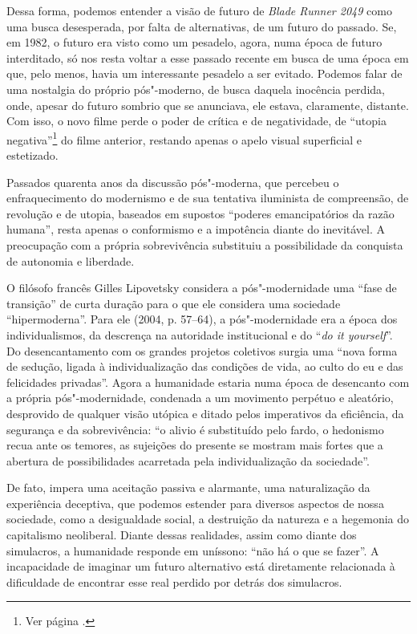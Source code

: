 Dessa forma, podemos entender a visão de futuro de \emph{Blade Runner
2049} como uma busca desesperada, por falta de alternativas, de um
futuro do passado. Se, em 1982, o futuro era visto como um pesadelo,
agora, numa época de futuro interditado, só nos resta voltar a esse
passado recente em busca de uma época em que, pelo menos, havia um
interessante pesadelo a ser evitado. Podemos falar de uma nostalgia do
próprio pós"-moderno, de busca daquela inocência perdida, onde, apesar do
futuro sombrio que se anunciava, ele estava, claramente, distante. Com
isso, o novo filme perde o poder de crítica e de negatividade, de
``utopia negativa''\footnote{Ver página \pageref{utopianegativa}.} do filme anterior, restando apenas o apelo visual
superficial e estetizado.

Passados quarenta anos da discussão pós"-moderna, que percebeu o
enfraquecimento do modernismo e de sua tentativa iluminista de
compreensão, de revolução e de utopia, baseados em supostos ``poderes
emancipatórios da razão humana'', resta apenas o conformismo e a
impotência diante do inevitável. A preocupação com a própria
sobrevivência substituiu a possibilidade da conquista de autonomia e
liberdade.

O filósofo francês Gilles Lipovetsky considera a pós"-modernidade uma
``fase de transição'' de curta duração para o que ele considera uma
sociedade ``hipermoderna''. Para ele (2004, p. 57--64), a pós"-modernidade
era a época dos individualismos, da descrença na autoridade
institucional e do ``\emph{do it yourself}''. Do desencantamento com os grandes
projetos coletivos surgia uma ``nova forma de sedução, ligada à
individualização das condições de vida, ao culto do eu e das felicidades
privadas''. Agora a humanidade estaria numa época de desencanto com a
própria pós"-modernidade, condenada a um movimento perpétuo e aleatório,
desprovido de qualquer visão utópica e ditado pelos imperativos da
eficiência, da segurança e da sobrevivência: ``o alivio é substituído
pelo fardo, o hedonismo recua ante os temores, as sujeições do presente
se mostram mais fortes que a abertura de possibilidades acarretada pela
individualização da sociedade''.

De fato, impera uma aceitação passiva e alarmante, uma naturalização da
experiência deceptiva, que podemos estender para diversos aspectos de
nossa sociedade, como a desigualdade social, a destruição da natureza e
a hegemonia do capitalismo neoliberal. Diante dessas realidades, assim
como diante dos simulacros, a humanidade responde em uníssono: ``não há o que
se fazer''. A incapacidade de imaginar um futuro alternativo está
diretamente relacionada à dificuldade de encontrar esse real perdido por
detrás dos simulacros.

